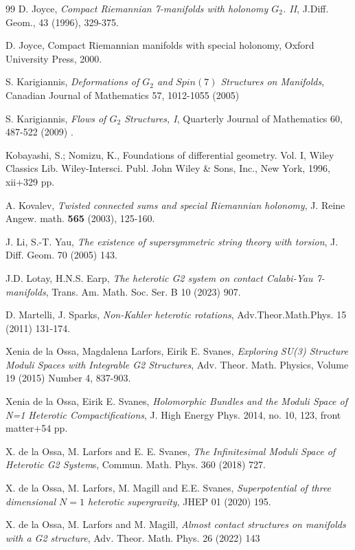 \documentclass[10pt,british]{article}
\begin{document}
\begin{thebibliography}{99}
 D. Joyce, {\em Compact Riemannian 7-manifolds with holonomy
  $G_2$. II}, J.Diff. Geom.,  43 (1996), 329-375.

 D. Joyce, Compact Riemannian manifolds with special holonomy,
  Oxford University Press, 2000.

   S. Karigiannis, \emph{ Deformations of $G_2$ and $Spin(7)$  Structures on Manifolds}, Canadian Journal of Mathematics 57, 1012-1055 (2005) %


  S. Karigiannis, \emph{ Flows of $G_2$ Structures, I},  Quarterly Journal of Mathematics 60, 487-522 (2009) .

 Kobayashi, S.; Nomizu, K., Foundations of differential geometry. Vol. I, Wiley Classics Lib. Wiley-Intersci. Publ. John Wiley \& Sons, Inc., New York, 1996, xii+329 pp.

 A. Kovalev, {\em Twisted connected sums and special
  Riemannian holonomy}, J. Reine Angew. math. {\bf 565} (2003), 125-160.


 J. Li, S.-T. Yau, \emph{The existence of supersymmetric string theory with torsion}, J. Diff. Geom.
70 (2005) 143.

  J.D. Lotay,  H.N.S. Earp, \emph{The heterotic G2 system on contact Calabi-Yau 7-manifolds}, Trans. Am. Math. Soc. Ser. B 10 (2023) 907.

 D. Martelli, J. Sparks, \emph{Non-Kahler heterotic rotations}, Adv.Theor.Math.Phys. 15
(2011) 131-174.

   Xenia de la Ossa, Magdalena Larfors, Eirik E. Svanes,
\emph{Exploring SU(3) Structure Moduli Spaces with Integrable G2
Structures}, Adv. Theor. Math. Physics, Volume 19 (2015) Number 4, 837-903.

 Xenia de la Ossa, Eirik E. Svanes, \emph{Holomorphic Bundles
and the Moduli Space of N=1 Heterotic Compactifications},  J. High Energy Phys. 2014, no. 10, 123, front matter+54 pp. 

 X. de la Ossa, M. Larfors and E. E. Svanes, \emph{The Infinitesimal Moduli Space of Heterotic G2 System}s, Commun. Math. Phys. 360 (2018) 727.

X. de la Ossa, M. Larfors, M. Magill and E.E. Svanes, \emph{Superpotential of three dimensional $N=1$ heterotic supergravity}, JHEP 01 (2020) 195.

 X. de la Ossa, M. Larfors and M. Magill, \emph{Almost contact structures on manifolds with a G2 structure}, Adv. Theor. Math. Phys. 26 (2022) 143 


\end{thebibliography}
\end{document}

